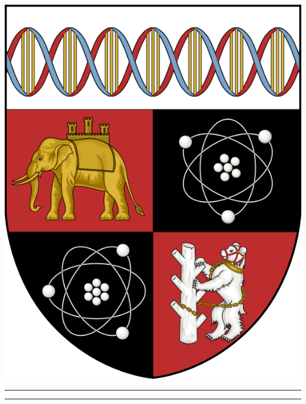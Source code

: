 
\begin{titlepage}
\centering

\vspace*{2cm} %

\begin{minipage}{0.9\textwidth}
\centering

\includegraphics[scale=0.2]{Figures/logo/university_crest.png}

\vspace{1em}
\noindent\rule{13cm}{1pt}

\vspace{1em}

{\makeatletter
\largetitlestyle\fontsize{16}{16}\selectfont\@title
\makeatother}

{\makeatletter
\ifdefvoid{\@subtitle}{}{\bigskip\titlestyle\fontsize{14}{14}\selectfont\@subtitle}
\makeatother}

\vspace{1em}
\noindent\rule{13cm}{1pt}


\end{minipage}
\end{titlepage}
